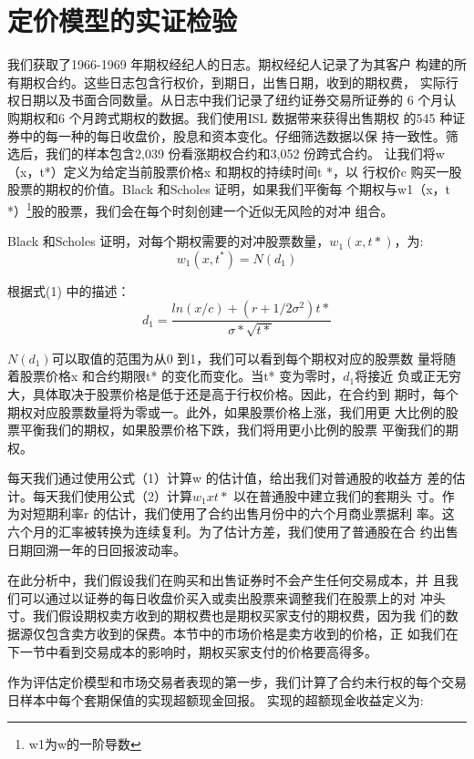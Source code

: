 \section{定价模型的实证检验}
\par{
    我们获取了1966-1969 年期权经纪人的日志。期权经纪人记录了为其客户
构建的所有期权合约。这些日志包含行权价，到期日，出售日期，收到的期权费，
实际行权日期以及书面合同数量。从日志中我们记录了纽约证券交易所证券的
6 个月认购期权和6 个月跨式期权的数据。我们使用ISL 数据带来获得出售期权
的545 种证券中的每一种的每日收盘价，股息和资本变化。仔细筛选数据以保
持一致性。筛选后，我们的样本包含2,039 份看涨期权合约和3,052 份跨式合约。
让我们将w（x，t*）定义为给定当前股票价格x 和期权的持续时间t *，以
行权价c 购买一股股票的期权的价值。Black 和Scholes 证明，如果我们平衡每
个期权与w1（x，t *）\footnote{w1为w的一阶导数}股的股票，我们会在每个时刻创建一个近似无风险的对冲
组合。
}
\par{
    Black 和Scholes 证明，对每个期权需要的对冲股票数量，$w_1(x,t*)$，为:
}
\begin{equation}
    w_1(x,t^*)=N(d_1)
\end{equation}
\par{
    根据式(1) 中的描述：
}
\begin{equation}
    d_1=\frac{ln(x/c)+(r+1/2\sigma^2)t*}{\sigma*{\sqrt{t*}}}
\end{equation}
\par{
    $N(d_1)$可以取值的范围为从0 到1，我们可以看到每个期权对应的股票数
量将随着股票价格x 和合约期限t* 的变化而变化。当t* 变为零时，$d_1$将接近
负或正无穷大，具体取决于股票价格是低于还是高于行权价格。因此，在合约到
期时，每个期权对应股票数量将为零或一。此外，如果股票价格上涨，我们用更
大比例的股票平衡我们的期权，如果股票价格下跌，我们将用更小比例的股票
平衡我们的期权。
}
\par{
    每天我们通过使用公式（1）计算w 的估计值，给出我们对普通股的收益方
差的估计。每天我们使用公式（2）计算$w_1xt*$ 以在普通股中建立我们的套期头
寸。作为对短期利率r 的估计，我们使用了合约出售月份中的六个月商业票据利
率。这六个月的汇率被转换为连续复利。为了估计方差，我们使用了普通股在合
约出售日期回溯一年的日回报波动率。
}
\par{在此分析中，我们假设我们在购买和出售证券时不会产生任何交易成本，并
且我们可以通过以证券的每日收盘价买入或卖出股票来调整我们在股票上的对
冲头寸。我们假设期权卖方收到的期权费也是期权买家支付的期权费，因为我
们的数据源仅包含卖方收到的保费。本节中的市场价格是卖方收到的价格，正
如我们在下一节中看到交易成本的影响时，期权买家支付的价格要高得多。
}
\par{
    作为评估定价模型和市场交易者表现的第一步，我们计算了合约未行权的每个交易日样本中每个套期保值的实现超额现金回报。 实现的超额现金收益定义为:
}
